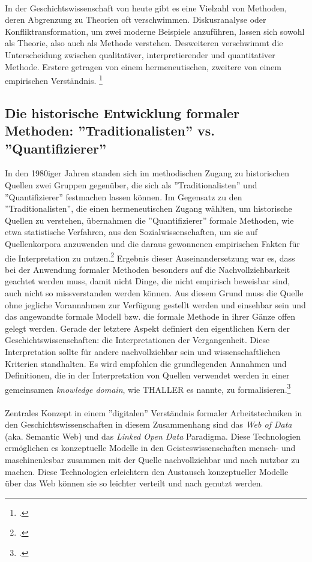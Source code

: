 \documentclass[12pt,a4paper]{article}
\begin{document}
\\
In der Geschichtswissenschaft von heute gibt es eine Vielzahl von Methoden, deren Abgrenzung zu Theorien oft verschwimmen. Diskusranalyse oder Konfliktransformation, um zwei moderne Beispiele anzuführen, lassen sich sowohl als Theorie, also auch als Methode verstehen. Desweiteren verschwimmt die Unterscheidung zwischen qualitativer, interpretierender und quantitativer Methode. Erstere getragen von einem hermeneutischen, zweitere von einem empirischen Verständnis. 
\footcite[Vgl, TODO][S. 1--5]{sokollgrundlagen}

\subsection{Die historische Entwicklung formaler Methoden: ''Traditionalisten'' vs. ''Quantifizierer'' }

In den 1980iger Jahren standen sich im methodischen Zugang zu historischen Quellen zwei Gruppen gegenüber, die sich als ''Traditionalisten'' und ''Quantifizierer'' festmachen lassen können. Im Gegensatz zu den ''Traditionalisten'', die einen hermeneutischen Zugang wählten, um historische Quellen zu verstehen, übernahmen die ''Quantifizierer'' formale Methoden, wie etwa statistische Verfahren, aus den Sozialwissenschaften, um sie auf Quellenkorpora anzuwenden und die daraus gewonnenen empirischen Fakten für die Interpretation zu nutzen.\footcite[][S.XX-XX]{jarausch1985quantitative} Ergebnis dieser Auseinandersetzung war es, dass bei der Anwendung formaler Methoden besonders auf die Nachvollziehbarkeit geachtet werden muss, damit nicht Dinge, die nicht empirisch beweisbar sind, auch nicht so missverstanden werden können. Aus diesem Grund muss die Quelle ohne jegliche Vorannahmen zur Verfügung gestellt werden und einsehbar sein und das angewandte formale Modell bzw. die formale Methode in ihrer Gänze offen gelegt werden. Gerade der letztere Aspekt definiert den eigentlichen Kern der Geschichtswissenschaften: die Interpretationen der Vergangenheit. Diese Interpretation sollte für andere nachvollziehbar sein und wissenschaftlichen Kriterien standhalten. Es wird empfohlen die grundlegenden Annahmen und Definitionen, die in der Interpretation von Quellen verwendet werden in einer gemeinsamen \textit{knowledge domain}, wie THALLER es nannte, zu formalisieren.\footcite[][S.XX-XX]{thaller2017historical}
\\ 
\\
Zentrales Konzept in einem ''digitalen'' Verständnis formaler Arbeitstechniken in den Geschichtswissenschaften in diesem Zusammenhang sind das \textit{Web of Data} (aka. Semantic Web) und das \textit{Linked Open Data} Paradigma. Diese Technologien ermöglichen es konzeptuelle Modelle in den Geisteswissenschaften mensch- und maschinenlesbar zusammen mit der Quelle nachvollziehbar und nach nutzbar zu machen. Diese Technologien erleichtern den Austausch konzeptueller Modelle über das Web können sie so leichter verteilt und nach genutzt werden.
\end{document}
